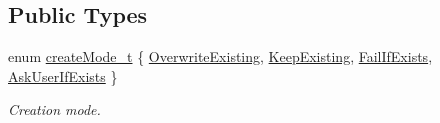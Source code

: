 \subsection*{Public Types}
\begin{DoxyCompactItemize}
\item 
enum \hyperlink{classmdt_sql_database_manager_a2f5b46d67a88095053a5edfc415c7418}{create\-Mode\-\_\-t} \{ \hyperlink{classmdt_sql_database_manager_a2f5b46d67a88095053a5edfc415c7418a4fc53f0ca5f4c3069d1f76363dd1c33d}{Overwrite\-Existing}, 
\hyperlink{classmdt_sql_database_manager_a2f5b46d67a88095053a5edfc415c7418acc4863e1f1744ee33870efa25d0f4069}{Keep\-Existing}, 
\hyperlink{classmdt_sql_database_manager_a2f5b46d67a88095053a5edfc415c7418a8ce7ece0b37cefb97d7ebc4ca058691a}{Fail\-If\-Exists}, 
\hyperlink{classmdt_sql_database_manager_a2f5b46d67a88095053a5edfc415c7418a07472a134a2612efd3b088ab8af78ad6}{Ask\-User\-If\-Exists}
 \}
\begin{DoxyCompactList}\small\item\em Creation mode. \end{DoxyCompactList}\end{DoxyCompactItemize}
